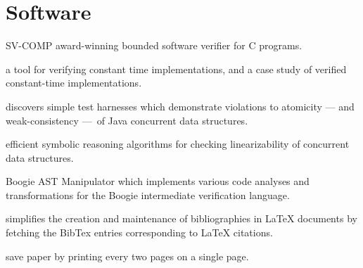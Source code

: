 \documentclass{article}
\begin{document}
  \section*{Software}

  \begin{description}[leftmargin=0cm]

    \item[\href{%
    https://github.com/smackers/smack}{%
    SMACK},] SV-COMP award-winning bounded software verifier for C programs.



    \item[\href{%
    https://github.com/imdea-software/verifying-constant-time}{%
    ct-verif},] a tool for verifying constant time implementations, and a case study of verified constant-time implementations.



    \item[\href{%
    https://github.com/michael-emmi/violat}{%
    Violat},] discovers simple test harnesses which demonstrate violations to atomicity — and weak-consistency — of Java concurrent data structures.



    \item[\href{%
    https://github.com/imdea-software/violin}{%
    Violin},] efficient symbolic reasoning algorithms for checking linearizability of concurrent data structures.



    \item[\href{%
    https://github.com/michael-emmi/bam-bam-boogieman}{%
    BAM! BAM! Boogieman},] Boogie AST Manipulator which implements various code analyses and transformations for the Boogie intermediate verification language.



    \item[\href{%
    https://github.com/michael-emmi/bibly}{%
    Bibly},] simplifies the creation and maintenance of bibliographies in LaTeX documents by fetching the BibTex entries corresponding to LaTeX citations.



    \item[\href{%
    https://github.com/michael-emmi/2up}{%
    2up},] save paper by printing every two pages on a single page.


  \end{description}
\end{document}
